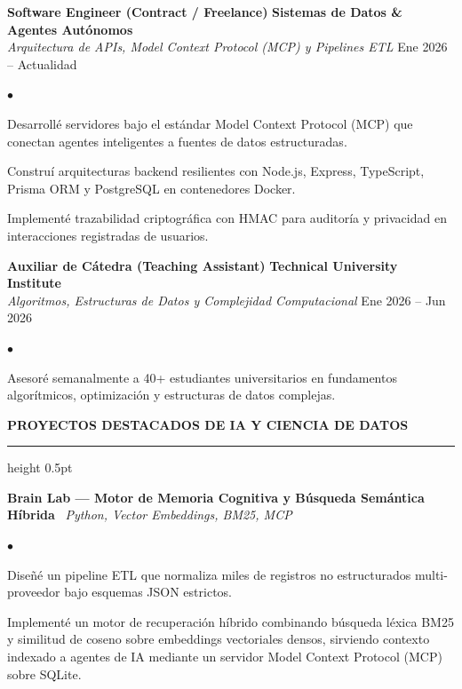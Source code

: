\documentclass[10pt,letterpaper]{article}
\newcommand{\resumesection}[1]{%
  \vspace{2pt}%
  {\color{primary}\normalsize\bfseries\MakeUppercase{#1}}%
  \vspace{1pt}\hrule height 0.5pt\vspace{2pt}%
}
\renewenvironment{itemize}{%
  \begin{list}{\color{primary}$\bullet$}{%
    \setlength{\leftmargin}{1.1em}%
    \setlength{\itemsep}{0.5pt}%
    \setlength{\topsep}{1pt}%
    \setlength{\parsep}{0pt}%
    \setlength{\partopsep}{0pt}%
  }%
}{%
  \end{list}%
}
\begin{document}
\vspace{1.5pt}

\textbf{Software Engineer (Contract / Freelance)} \hfill \textbf{Sistemas de Datos \& Agentes Autónomos} \\
\textit{Arquitectura de APIs, Model Context Protocol (MCP) y Pipelines ETL} \hfill Ene 2026 -- Actualidad
\begin{itemize}
    \item Desarrollé servidores bajo el estándar Model Context Protocol (MCP) que conectan agentes inteligentes a fuentes de datos estructuradas.
    \item Construí arquitecturas backend resilientes con Node.js, Express, TypeScript, Prisma ORM y PostgreSQL en contenedores Docker.
    \item Implementé trazabilidad criptográfica con HMAC para auditoría y privacidad en interacciones registradas de usuarios.
\end{itemize}

\vspace{1.5pt}

\textbf{Auxiliar de Cátedra (Teaching Assistant)} \hfill \textbf{Technical University Institute} \\
\textit{Algoritmos, Estructuras de Datos y Complejidad Computacional} \hfill Ene 2026 -- Jun 2026
\begin{itemize}
    \item Asesoré semanalmente a 40+ estudiantes universitarios en fundamentos algorítmicos, optimización y estructuras de datos complejas.
\end{itemize}

\resumesection{Proyectos Destacados de IA y Ciencia de Datos}

\textbf{Brain Lab — Motor de Memoria Cognitiva y Búsqueda Semántica Híbrida} \textbar\ \textit{Python, Vector Embeddings, BM25, MCP}
\begin{itemize}
    \item Diseñé un pipeline ETL que normaliza miles de registros no estructurados multi-proveedor bajo esquemas JSON estrictos.
    \item Implementé un motor de recuperación híbrido combinando búsqueda léxica BM25 y similitud de coseno sobre embeddings vectoriales densos, sirviendo contexto indexado a agentes de IA mediante un servidor Model Context Protocol (MCP) sobre SQLite.
\end{itemize}

\vspace{1pt}
\end{document}
